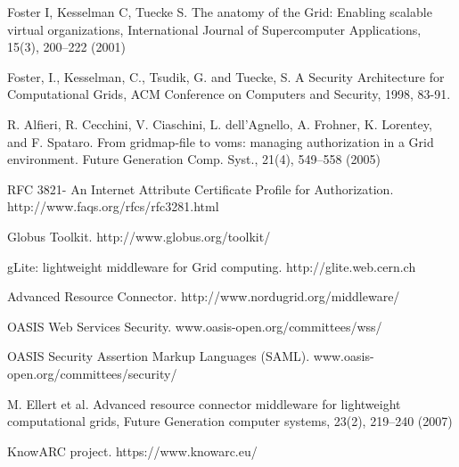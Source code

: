 \documentclass[twocolumn]{svjour3}         %
\begin{document}

\begin{thebibliography}{}
%
%

Foster I, Kesselman C, Tuecke S. The anatomy of the Grid: Enabling scalable virtual organizations, International Journal of Supercomputer Applications, 15(3), 200–222 (2001)

Foster, I., Kesselman, C., Tsudik, G. and Tuecke, S. A Security Architecture for Computational Grids, ACM Conference on Computers and Security, 1998, 83-91.

R. Alfieri, R. Cecchini, V. Ciaschini, L. dell’Agnello, A. Frohner, K. Lorentey, and F. Spataro. From gridmap-file to voms: managing authorization in a Grid environment. Future Generation Comp. Syst., 21(4), 549–558 (2005)

RFC 3821- An Internet Attribute Certificate Profile for Authorization. http://www.faqs.org/rfcs/rfc3281.html

Globus Toolkit. http://www.globus.org/toolkit/

gLite: lightweight middleware for Grid computing. http://glite.web.cern.ch

Advanced Resource Connector. http://www.nordugrid.org/middleware/

OASIS Web Services Security. www.oasis-open.org/committees/wss/

OASIS Security Assertion Markup Languages (SAML). www.oasis-open.org/committees/security/

M. Ellert et al. Advanced resource connector middleware for lightweight computational grids, Future Generation computer systems, 23(2), 219–240 (2007)

KnowARC project.  https://www.knowarc.eu/


\end{thebibliography}
\end{document}

